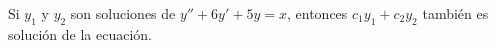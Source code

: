 \item Si $y_1$ y $y_2$ son soluciones de $y'' + 6y' + 5y = x$, entonces $c_1y_1 + c_2y_2$ también es solución de la ecuación.

